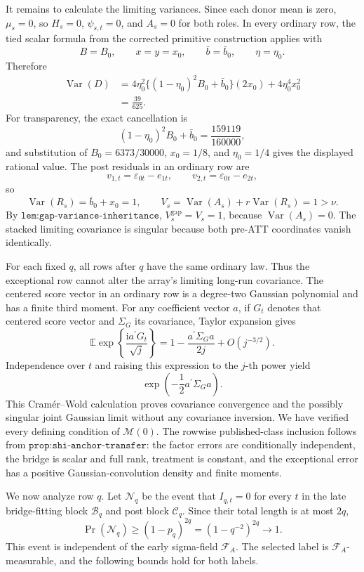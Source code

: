 It remains to calculate the limiting variances.  Since each donor mean is zero, \(\mu_s=0\), so \(H_s=0\), \(\psi_{s,t}=0\), and \(A_s=0\) for both roles.  In every ordinary row, the tied scalar formula from the corrected primitive construction applies with
\[
 B=B_0,\qquad x=y=x_0,\qquad
 \bar b=\bar b_0,\qquad \eta=\eta_0.
\]
Therefore
\[
 \begin{aligned}
 \operatorname{Var}(D)
 &=4\eta_0^2\{(1-\eta_0)^2B_0+\bar b_0\}(2x_0)
   +4\eta_0^4x_0^2\\
 &=\frac{39}{625}.
 \end{aligned}
\]
For transparency, the exact cancellation is
\[
 (1-\eta_0)^2B_0+\bar b_0
 =\frac{159119}{160000},
\]
and substitution of \(B_0=6373/30000\), \(x_0=1/8\), and \(\eta_0=1/4\) gives the displayed rational value.  The post residuals in an ordinary row are
\[
 v_{1,t}=\varepsilon_{0t}-e_{1t},\qquad
 v_{2,t}=\varepsilon_{0t}-e_{2t},
\]
so
\[
 \operatorname{Var}(R_s)=\bar b_0+x_0=1,
\qquad
 V_s=\operatorname{Var}(A_s)+r\operatorname{Var}(R_s)=1>\nu.
\]
By \(\texttt{lem:gap-variance-inheritance}\), \(V_s^{\mathrm{gap}}=V_s=1\), because \(\operatorname{Var}(A_s)=0\).  The stacked limiting covariance is singular because both pre-ATT coordinates vanish identically.

For each fixed \(q\), all rows after \(q\) have the same ordinary law.  Thus the exceptional row cannot alter the array's limiting long-run covariance.  The centered score vector in an ordinary row is a degree-two Gaussian polynomial and has a finite third moment.  For any coefficient vector \(a\), if \(G_t\) denotes that centered score vector and \(\Sigma_G\) its covariance, Taylor expansion gives
\[
 \mathbb E\exp\!\left\{\frac{\mathrm i a^\prime G_t}{\sqrt j}\right\}
 =1-\frac{a^\prime\Sigma_Ga}{2j}+O(j^{-3/2}).
\]
Independence over \(t\) and raising this expression to the \(j\)-th power yield
\[
 \exp\!\left(-\frac12a^\prime\Sigma_Ga\right).
\]
This Cramér--Wold calculation proves covariance convergence and the possibly singular joint Gaussian limit without any covariance inversion.  We have verified every defining condition of \(\mathcal M(0)\).  The rowwise published-class inclusion follows from \(\texttt{prop:shi-anchor-transfer}\): the factor errors are conditionally independent, the bridge is scalar and full rank, treatment is constant, and the exceptional error has a positive Gaussian-convolution density and finite moments.

We now analyze row \(q\).  Let \(\mathcal N_q\) be the event that \(I_{q,t}=0\) for every \(t\) in the late bridge-fitting block \(\mathcal B_q\) and post block \(\mathcal C_q\).  Since their total length is at most \(2q\),
\[
 \Pr(\mathcal N_q)\geq(1-p_q)^{2q}
 =(1-q^{-2})^{2q}\longrightarrow1.
\]
This event is independent of the early sigma-field \(\mathcal F_A\).  The selected label is \(\mathcal F_A\)-measurable, and the following bounds hold for both labels.

